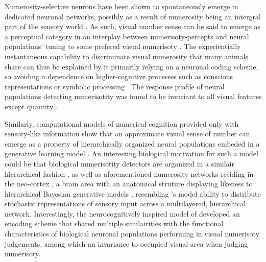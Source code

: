 \documentclass[twocolumn]{article}
\begin{document}
Numerosity-selective neurons have been shown to spontaneously emerge in dedicated neuronal networks, possibly as a result of numerosity being an intergral part of the sensory world \citep{viswanathan2013neuronal}. As such, visual number sense can be said to emerge as a perceptual category in an interplay between numerisoty-percepts and neural populations' tuning to some prefered visual numerisoty \citep{nieder2016neuronal}. The experientially instantaneous capability to discriminate visual numerosity that many animals share \citep{nieder2016neuronal, animalsnumericalcognition} can thus be explained by it primarily relying on a neuronal coding scheme, so avoiding a dependence on higher-cognitive processes such as conscious representations \citep[p.~58 points to types of visual number sense being pre-attentive]{dehaene2011number} or symbolic processing \citep[visual numerosity percepts are understood non-verbally,][]{nieder2016neuronal}. The response profile of neural populations detecting numerisotity was found to be invariant to all visual features except quantity \citep{nieder2016neuronal, harvey2013topographic}.

Similarly, computational models of numerical cognition provided only with sensory-like information  show that an approximate visual sense of number can emerge as a property of hierarchically organized neural populations embeded in a generative learning model \citep{stoianov2012}. An interesting biological motivation for such a model could be that biological numerisotity detectors are organized in a similair hierarchical fashion \citep{nieder2016neuronal, viswanathan2013neuronal}, as well as aforementioned numerosity networks residing in the neo-cortex \citep{nieder2016neuronal}, a brain area with an anatomical struture displaying likeness to hierarchical Bayesian generative models
\citetext{\citealp{friston2003learning}; although the brain in general is sometimes characterized as a probabilistic modeler of it's sensory world, e.g. \citealp{bayesianbrain, griffiths2006optimal}}, resembling \citet{stoianov2012}'s model ability to distribute stochastic representations of sensory input across a multilayered, hierarchical network. Interestingly, the neurocognitively inspired model of \citet{stoianov2012} developed an encoding scheme that shared multiple similairities with the functional characteristics of biological neuronal populations performing in visual numerisoty judgements, among which an invariance to occupied visual area when judging numerisoty.
\end{document}
